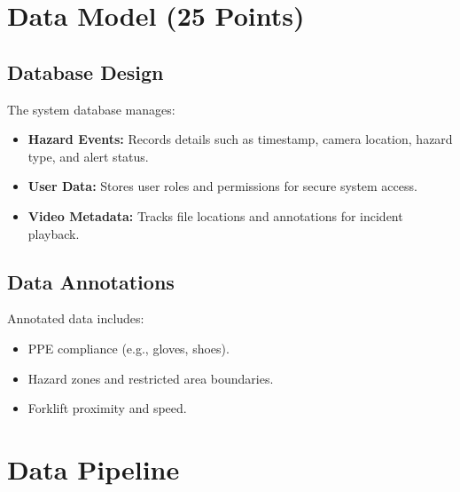 \documentclass[12pt]{article}
\begin{document}
\newpage
\section{Data Model (25 Points)}
\subsection{Database Design}
The system database manages:
\begin{itemize}
    \item \textbf{Hazard Events:} Records details such as timestamp, camera location, hazard type, and alert status.
    \item \textbf{User Data:} Stores user roles and permissions for secure system access.
    \item \textbf{Video Metadata:} Tracks file locations and annotations for incident playback.
\end{itemize}


\subsection{Data Annotations}
Annotated data includes:
\begin{itemize}
    \item PPE compliance (e.g., gloves, shoes).
    \item Hazard zones and restricted area boundaries.
    \item Forklift proximity and speed.
\end{itemize}

\section{Data Pipeline}
\end{document}

